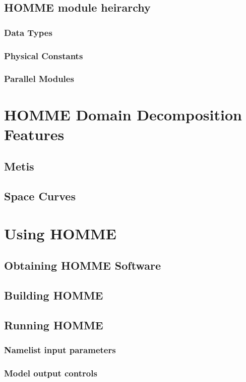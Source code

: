 \documentclass[12pt]{article}
\numberwithin{equation}{section}
\begin{document}
\subsection{HOMME module heirarchy}					%
\subsubsection{Data Types} 							%
\subsubsection{Physical Constants}						%
\subsubsection{Parallel Modules} 						%

\section{HOMME Domain Decomposition Features} 		%
\subsection{Metis}
\subsection{Space Curves}

\section{Using HOMME}								%
\subsection{Obtaining HOMME Software}					%
\subsection{Building HOMME}
\subsection{Running HOMME}
\subsubsection{Namelist input parameters}
\subsubsection{Model output controls}
\end{document}
